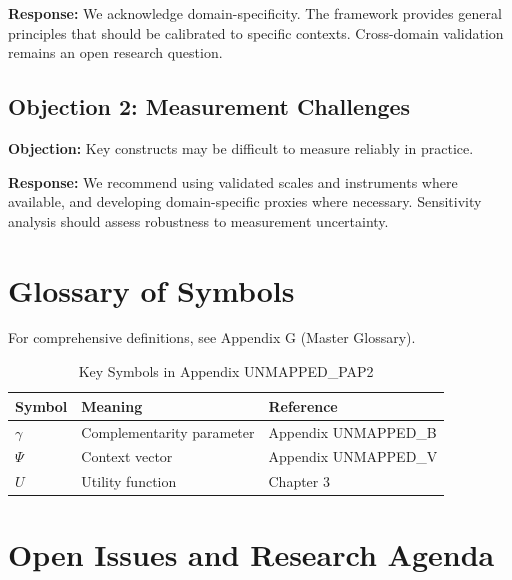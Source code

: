 \textbf{Response:} We acknowledge domain-specificity. The framework provides
general principles that should be calibrated to specific contexts. Cross-domain
validation remains an open research question.

\subsection{Objection 2: Measurement Challenges}

\textbf{Objection:} Key constructs may be difficult to measure reliably in
practice.

\textbf{Response:} We recommend using validated scales and instruments where
available, and developing domain-specific proxies where necessary. Sensitivity
analysis should assess robustness to measurement uncertainty.



\section{Glossary of Symbols}
\label{sec:pap2-glossary}

For comprehensive definitions, see Appendix G (Master Glossary).

\begin{table}[htbp]
\centering
\caption{Key Symbols in Appendix UNMAPPED_PAP2}
\begin{tabular}{lll}
\toprule
\textbf{Symbol} & \textbf{Meaning} & \textbf{Reference} \\
\midrule
$\gamma$ & Complementarity parameter & Appendix UNMAPPED_B \\
$\Psi$ & Context vector & Appendix UNMAPPED_V \\
$U$ & Utility function & Chapter 3 \\
\bottomrule
\end{tabular}
\end{table}



\section{Open Issues and Research Agenda}
\label{sec:x-open}


